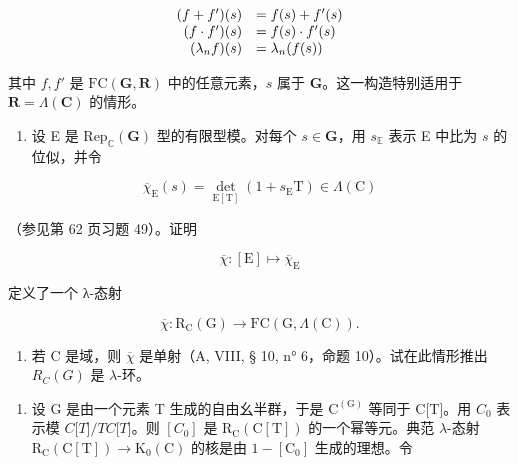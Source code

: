\[
\begin{array}{r l} (f + f ^ {\prime}) (s) & = f (s) + f ^ {\prime} (s) \\ (f \cdot f ^ {\prime}) (s) & = f (s) \cdot f ^ {\prime} (s) \\ (\lambda_ {n} f) (s) & = \lambda_ {n} (f (s)) \end{array}
\]

其中 \(f, f'\) 是 \(\mathrm{FC}(\mathbf{G}, \mathbf{R})\) 中的任意元素，\(s\) 属于 \(\mathbf{G}\)。这一构造特别适用于 \(\mathbf{R} = \Lambda(\mathbf{C})\) 的情形。

\begin{enumerate}
\def\labelenumi{\alph{enumi})}
\setcounter{enumi}{3}
\tightlist
\item
  设 E 是 \(\mathrm{Rep}_{\mathbb{C}}(\mathbf{G})\) 型的有限型模。对每个 \(s \in \mathbf{G}\)，用 \(s_{\mathbb{E}}\) 表示 E 中比为 \(s\) 的位似，并令
\end{enumerate}

\[
\overline {{{{\chi}}}} _ {\mathrm{E}} (s) = \det _ {\mathrm{E} [ \mathrm{T} ]} (1 + s _ {\mathrm{E}} \mathrm{T}) \in \Lambda (\mathrm{C})
\]

（参见第 62 页习题 49）。证明

\[
\overline {{{{\chi}}}}: [ \mathrm{E} ] \mapsto \overline {{{{\chi}}}} _ {\mathrm{E}}
\]

定义了一个 λ-态射

\[
\overline {{{{\chi}}}}: \mathrm{R} _ {\mathrm{C}} (\mathrm{G}) \rightarrow \mathrm{FC} (\mathrm{G}, \Lambda (\mathrm{C})).
\]

\begin{enumerate}
\def\labelenumi{\alph{enumi})}
\setcounter{enumi}{4}
\tightlist
\item
  若 C 是域，则 \(\overline{\chi}\) 是单射（A, VIII, § 10, n° 6，命题 10）。试在此情形推出 \(R_{C}(G)\) 是 \(\lambda\)-环。
\end{enumerate}

\begin{enumerate}
\def\labelenumi{\arabic{enumi})}
\setcounter{enumi}{55}
\tightlist
\item
  设 G 是由一个元素 T 生成的自由幺半群，于是 \(\mathrm{C}^{(\mathrm{G})}\) 等同于 C{[}T{]}。用 \(C_{0}\) 表示模 \(C{[}T{]}/T C{[}T{]}\)。则 \([C_{0}]\) 是 \(\mathrm{R}_{\mathrm{C}}(\mathrm{C}[\mathrm{T}])\) 的一个幂等元。典范 \(\lambda\)-态射 \(\mathrm{R}_{\mathrm{C}}(\mathrm{C}[\mathrm{T}]) \rightarrow \mathrm{K}_{0}(\mathrm{C})\) 的核是由 \(1 - [\mathrm{C}_{0}]\) 生成的理想。令
\end{enumerate}

